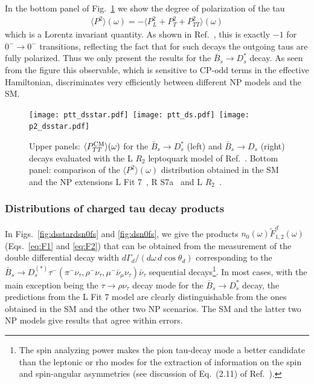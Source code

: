 \documentclass[aps,superscriptaddress,showpacs,nofootinbib,11pt]{revtex4-1}
\newcommand{\bea}{\begin{eqnarray}} \newcommand{\eea}{\end{eqnarray}}
\begin{document}
In the bottom panel of Fig.~\ref{fig:ptt} we show the degree of polarization of the tau 
%
\bea
\langle P^2\rangle(\omega)=-\langle P^2_L+P_T^2+P^2_{TT}\rangle(\omega)
\eea
%
which is a Lorentz invariant quantity. As shown in Ref.~\cite{Penalva:2021gef}, this is exactly $-1$ for $0^-\to 0^-$ transitions, reflecting the fact that for such decays the outgoing taus are fully polarized. Thus we  only present the results for the $\bar B_s\to D^*_s$ decay. As seen from the figure this observable, which is sensitive to CP-odd terms in the effective Hamiltonian, discriminates very efficiently between different NP models and the SM.
%
\begin{figure}
\begin{center}
\texttt{[image: ptt\_dsstar.pdf]}\
\texttt{[image: ptt\_ds.pdf]}\ 
\texttt{[image: p2\_dsstar.pdf]}\ 
\caption{ Upper panels:  $\langle P^{\rm CM}_{TT}\rangle(\omega)$ for the  $\bar B_s\to D^*_s$ (left) and $\bar B_s\to D_s$ (right) decays evaluated with the L $R_2$ leptoquark model of Ref.~\cite{Shi:2019gxi}. Bottom panel: comparison of the $\langle P^2\rangle(\omega)$ distribution obtained in the SM and the NP extensions L Fit 7~\cite{Murgui:2019czp}, R S7a~\cite{Mandal:2020htr} and
L $R_2$~\cite{Shi:2019gxi}.}
\label{fig:ptt}
\end{center}
\end{figure}
%
\subsubsection{Distributions of charged tau decay products}

In Figs.~\ref{fig:dsstardsn0fs} and \ref{fig:dsn0fs}, we give the products
$n_0(\omega)\widetilde F_{1,2}^d(\omega)$ (Eqs.~\eqref{eq:F1} and \eqref{eq:F2}) that can be obtained from the measurement of the double differential decay width $d\Gamma_d/(d\omega\, d\cos\theta_d)$ corresponding to the $\bar B_s\to D_s^{(*)}\tau^-(\pi^-\nu_\tau, \rho^-\nu_\tau, \mu^-\bar\nu_\mu\nu_\tau)\bar\nu_\tau$ sequential decays\footnote{The spin analyzing power makes the pion tau-decay mode a better candidate than the leptonic or rho modes for the extraction of information on the spin and spin-angular asymmetries (see discussion of Eq.~(2.11) of Ref.~\cite{Penalva:2022vxy}).}. In most cases, with the main exception being the $\tau\to \rho\nu_\tau$ decay mode for the $\bar B_s\to D_s^*$ decay, the predictions from the L Fit 7 model are clearly distinguishable from the ones obtained in the SM and the other two NP scenarios. The SM and the latter two NP models give results that agree within errors. 
\end{document}

